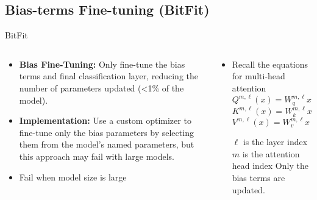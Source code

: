 \documentclass[serif, aspectratio=169]{beamer}
\begin{document}
\subsection{Bias-terms Fine-tuning (BitFit)}
\begin{frame}{BitFit}
    \begin{columns} %

        \begin{column}{0.5\textwidth}
            \begin{itemize}
                \item  
                    \textbf{Bias Fine-Tuning: }
                     Only fine-tune the bias terms and final classification layer, reducing the number of parameters updated (<1\% of the model).
                    \vspace{0.3cm}
                \item  
                    \textbf{Implementation: }
                      Use a custom optimizer to fine-tune only the bias parameters by selecting them from the model’s named parameters, but this approach may fail with large models.
                    \vspace{0.3cm}
                \item Fail when model size is large
            \end{itemize}
        \end{column}

        \begin{column}{0.5\textwidth}
            \begin{itemize}
                \item  
                    Recall the equations for multi-head attention
                    \[
                    Q^{m,\ell}(x) = W_q^{m,\ell} x + b_q^{m,\ell}
                    \]
                    \[
                    K^{m,\ell}(x) = W_k^{m,\ell} x + b_k^{m,\ell}
                    \]
                    \[
                    V^{m,\ell}(x) = W_v^{m,\ell} x + b_v^{m,\ell}
                    \]
                    \vspace{0.3cm}
                \begin{outline}
                    \1 \( \ell \) is the layer index
                    \1 \( m \) is the attention head index
                    \1 Only the bias terms are updated.
                \end{outline}
                    \vspace{0.3cm}
            \end{itemize}
        \end{column}

    \end{columns}
\end{frame}
\end{document}
